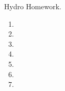 \documentclass[12pt,preprint]{aastex}  %
\begin{document}
Hydro Homework.

\begin{enumerate}
	\item 
	\item 
	\item 
	\item 
	\item 
	\item 
	\item 
\end{enumerate}
\end{document}
